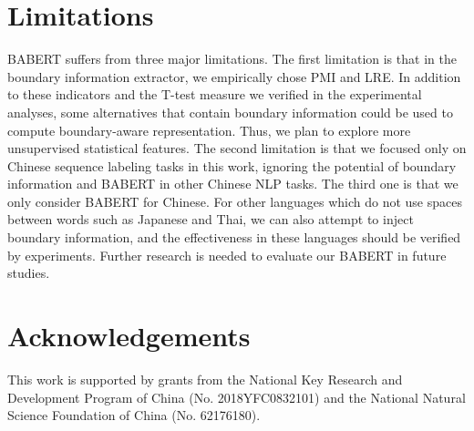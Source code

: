 \documentclass[11pt]{article}
\begin{document}
\begin{CJK}{UTF8}{gbsn}
\section*{Limitations}
BABERT suffers from three major limitations.
The first limitation is that in the boundary information extractor,
we empirically chose PMI and LRE. In addition to these indicators and the T-test measure we verified in the experimental analyses,
some alternatives that contain boundary information could be used to compute boundary-aware representation.
Thus, we plan to explore more unsupervised statistical features.
The second limitation is that we focused only on Chinese sequence labeling tasks in this work,
ignoring the potential of boundary information and BABERT in other Chinese NLP tasks.
The third one is that we only consider BABERT for Chinese.
For other languages which do not use spaces between words such as Japanese and Thai, 
we can also attempt to inject boundary information, and the effectiveness in these languages should be verified by experiments.
Further research is needed to evaluate our BABERT in future studies.

\section*{Acknowledgements}
This work is supported by grants from the National Key Research and Development Program of China (No. 2018YFC0832101) and the National Natural
Science Foundation of China (No. 62176180).












\end{CJK}
\end{document}
